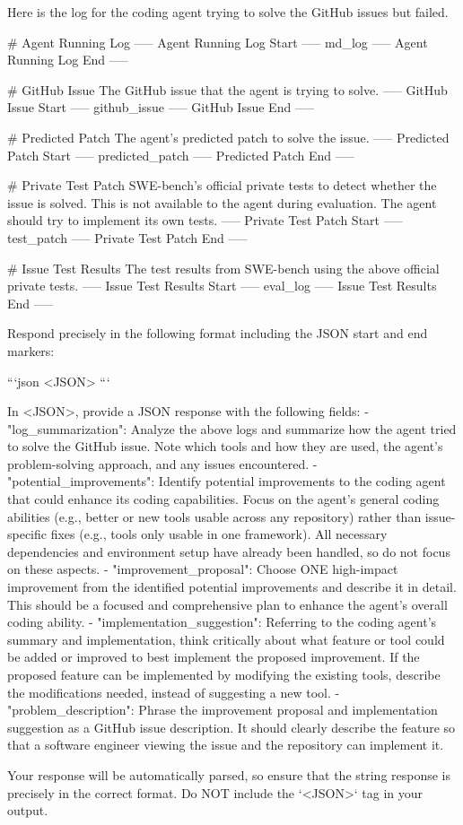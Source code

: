 \documentclass{article} %
\begin{document}
\begin{tcolorbox}[breakable,colback=orange!5!white, colframe=orange!80!black, title=Self-Improve Prompt]
\begin{MyVerbatim}
Here is the log for the coding agent trying to solve the GitHub issues but failed.

# Agent Running Log
----- Agent Running Log Start -----
{md_log}
----- Agent Running Log End -----

# GitHub Issue
The GitHub issue that the agent is trying to solve.
----- GitHub Issue Start -----
{github_issue}
----- GitHub Issue End -----

# Predicted Patch
The agent's predicted patch to solve the issue.
----- Predicted Patch Start -----
{predicted_patch}
----- Predicted Patch End -----

# Private Test Patch
SWE-bench's official private tests to detect whether the issue is solved. This is not available to the agent during evaluation. The agent should try to implement its own tests.
----- Private Test Patch Start -----
{test_patch}
----- Private Test Patch End -----

# Issue Test Results
The test results from SWE-bench using the above official private tests.
----- Issue Test Results Start -----
{eval_log}
----- Issue Test Results End -----

Respond precisely in the following format including the JSON start and end markers:

```json
<JSON>
```

In <JSON>, provide a JSON response with the following fields:
- "log_summarization": Analyze the above logs and summarize how the agent tried to solve the GitHub issue. Note which tools and how they are used, the agent's problem-solving approach, and any issues encountered.
- "potential_improvements": Identify potential improvements to the coding agent that could enhance its coding capabilities. Focus on the agent's general coding abilities (e.g., better or new tools usable across any repository) rather than issue-specific fixes (e.g., tools only usable in one framework). All necessary dependencies and environment setup have already been handled, so do not focus on these aspects.
- "improvement_proposal": Choose ONE high-impact improvement from the identified potential improvements and describe it in detail. This should be a focused and comprehensive plan to enhance the agent's overall coding ability.
- "implementation_suggestion": Referring to the coding agent's summary and implementation, think critically about what feature or tool could be added or improved to best implement the proposed improvement. If the proposed feature can be implemented by modifying the existing tools, describe the modifications needed, instead of suggesting a new tool.
- "problem_description": Phrase the improvement proposal and implementation suggestion as a GitHub issue description. It should clearly describe the feature so that a software engineer viewing the issue and the repository can implement it.

Your response will be automatically parsed, so ensure that the string response is precisely in the correct format. Do NOT include the `<JSON>` tag in your output.
\end{MyVerbatim}
\end{tcolorbox}
\end{document}
